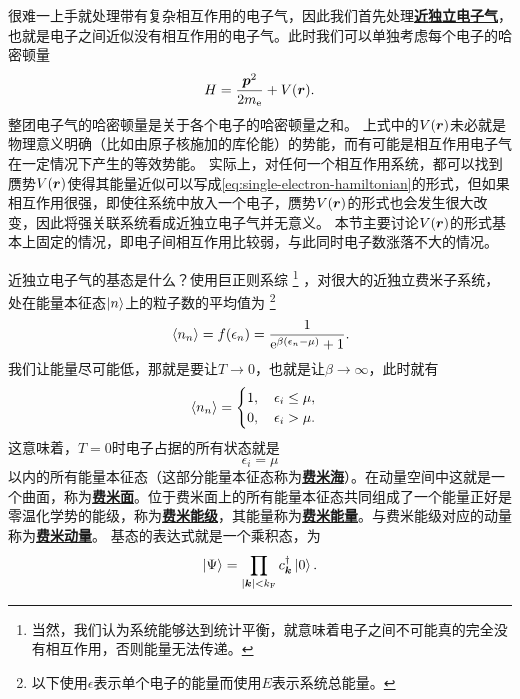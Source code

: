 \documentclass[hyperref, UTF8, a4paper]{ctexart}
\newcommand*{\ee}{\mathrm{e}}
\newcommand*{\concept}[1]{\underline{\textbf{#1}}}
\begin{document}
很难一上手就处理带有复杂相互作用的电子气，因此我们首先处理\concept{近独立电子气}，也就是电子之间近似没有相互作用的电子气。此时我们可以单独考虑每个电子的哈密顿量
\begin{equation}
    {H} = \frac{{\vb*{p}}^2}{2m_\text{e}} + V(\vb*{r}).
    \label{eq:single-electron-hamiltonian}
\end{equation}
整团电子气的哈密顿量是关于各个电子的哈密顿量之和。
上式中的$V(\vb*{r})$未必就是物理意义明确（比如由原子核施加的库伦能）的势能，而有可能是相互作用电子气在一定情况下产生的等效势能。
实际上，对任何一个相互作用系统，都可以找到赝势$V(\vb*{r})$使得其能量近似可以写成\eqref{eq:single-electron-hamiltonian}的形式，但如果相互作用很强，即使往系统中放入一个电子，赝势$V(\vb*{r})$的形式也会发生很大改变，因此将强关联系统看成近独立电子气并无意义。
本节主要讨论$V(\vb*{r})$的形式基本上固定的情况，即电子间相互作用比较弱，与此同时电子数涨落不大的情况。

近独立电子气的基态是什么？使用巨正则系综%
\footnote{当然，我们认为系统能够达到统计平衡，就意味着电子之间不可能真的完全没有相互作用，否则能量无法传递。}%
，对很大的近独立费米子系统，处在能量本征态$\ket{n}$上的粒子数的平均值为%
\footnote{以下使用$\epsilon$表示单个电子的能量而使用$E$表示系统总能量。}%
\begin{equation}
    \expval*{{n}_n} = f(\epsilon_n) = \frac{1}{\ee^{\beta (\epsilon_n-\mu)} + 1}.
    \label{eq:fermi-dirac-distribution}
\end{equation}
我们让能量尽可能低，那就是要让$T\to 0$，也就是让$\beta\to \infty$，此时就有
\begin{equation}
    \expval*{{n}_n} = \begin{cases}
        1, \quad \epsilon_i \leq \mu, \\
        0, \quad \epsilon_i > \mu.
    \end{cases}
\end{equation}
这意味着，$T=0$时电子占据的所有状态就是
\begin{equation}
    \epsilon_i = \mu
\end{equation}
以内的所有能量本征态（这部分能量本征态称为\concept{费米海}）。在动量空间中这就是一个曲面，称为\concept{费米面}。位于费米面上的所有能量本征态共同组成了一个能量正好是零温化学势的能级，称为\concept{费米能级}，其能量称为\concept{费米能量}。与费米能级对应的动量称为\concept{费米动量}。
基态的表达式就是一个乘积态，为
\begin{equation}
    \ket{\Psi} = \prod_{\abs{\vb*{k}} < k_\text{F}} {c}^\dagger_{\vb*{k}} \ket{0}.
    \label{eq:ground-state}
\end{equation}
\end{document}

